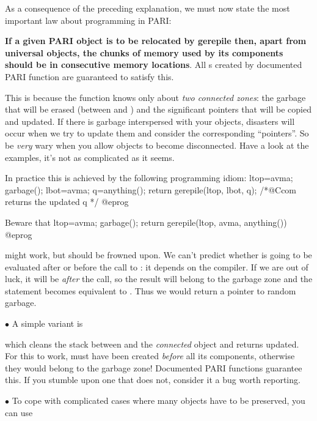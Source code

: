 As a consequence of the preceding explanation, we must now state the most
important law about programming in PARI:

{\bf If a given PARI object is to be relocated by \hbox{gerepile} then,
apart from universal objects, the chunks of memory used by its components
should be in consecutive memory locations}. All s created by
documented PARI function are guaranteed to satisfy this.

This is because the  function knows only about {\it two
connected zones\/}: the garbage that will be erased (between  and
) and the  significant pointers that will be copied and updated.
If there is garbage interspersed with your objects, disasters will occur when
we try to update them and consider the corresponding ``pointers''. So be
{\it very\/} wary when you allow objects to become disconnected. Have a look
at the examples, it's not as complicated as it seems.

\noindent In practice this is achieved by the following programming idiom:
\bprog
  ltop=avma; garbage(); lbot=avma; q=anything();
  return gerepile(ltop, lbot, q); /*@Ccom returns the updated q */
@eprog

\noindent Beware that
\bprog
  ltop=avma; garbage();
  return gerepile(ltop, avma, anything())
@eprog

\noindent might work, but should be frowned upon. We can't predict whether
 is going to be evaluated after or before the call to
: it depends on the compiler. If we are out of luck, it will
be {\it after\/} the call, so the result will belong to the garbage zone and
the  statement becomes equivalent to . Thus we
would return a pointer to random garbage.

\noindent$\bullet$ A simple variant is


\noindent which cleans the stack between  and the {\it connected\/}
object  and returns  updated. For this to work,  must
have been created {\it before\/} all its components, otherwise they would
belong to the garbage zone! Documented PARI functions guarantee this. If you
stumble upon one that does not, consider it a bug worth reporting.

\noindent$\bullet$
To cope with complicated cases where many objects have to be
preserved, you can use


